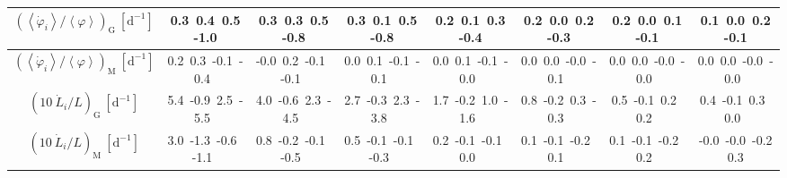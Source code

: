 \begin{table}[H]
{\begin{centering}
\begin{tabular}{|c|c|c|c|c|c|c|c|}
\hline
$\left(\left\langle \dot{\varphi}_{i}\right\rangle /\left\langle \varphi\right\rangle\right) _{\mathrm{G}}\ \left[\mathrm{d^{-1}}\right]$ & \textcolor{C1}{0.3}\ \textcolor{C2}{0.4}\ \textcolor{C3}{0.5}\ \textcolor{C4}{-1.0}\  & \textcolor{C1}{0.3}\ \textcolor{C2}{0.3}\ \textcolor{C3}{0.5}\ \textcolor{C4}{-0.8}\  & \textcolor{C1}{0.3}\ \textcolor{C2}{0.1}\ \textcolor{C3}{0.5}\ \textcolor{C4}{-0.8}\  & \textcolor{C1}{0.2}\ \textcolor{C2}{0.1}\ \textcolor{C3}{0.3}\ \textcolor{C4}{-0.4}\  & \textcolor{C1}{0.2}\ \textcolor{C2}{0.0}\ \textcolor{C3}{0.2}\ \textcolor{C4}{-0.3}\  & \textcolor{C1}{0.2}\ \textcolor{C2}{0.0}\ \textcolor{C3}{0.1}\ \textcolor{C4}{-0.1}\  & \textcolor{C1}{0.1}\ \textcolor{C2}{0.0}\ \textcolor{C3}{0.2}\ \textcolor{C4}{-0.1}\  \tabularnewline
\hline
$\left(\left\langle \dot{\varphi}_{i}\right\rangle /\left\langle \varphi\right\rangle\right) _{\mathrm{M}}\ \left[\mathrm{d^{-1}}\right]$ & \textcolor{C1}{0.2}\ \textcolor{C2}{0.3}\ \textcolor{C3}{-0.1}\ \textcolor{C4}{-0.4}\  & \textcolor{C1}{-0.0}\ \textcolor{C2}{0.2}\ \textcolor{C3}{-0.1}\ \textcolor{C4}{-0.1}\  & \textcolor{C1}{0.0}\ \textcolor{C2}{0.1}\ \textcolor{C3}{-0.1}\ \textcolor{C4}{-0.1}\  & \textcolor{C1}{0.0}\ \textcolor{C2}{0.1}\ \textcolor{C3}{-0.1}\ \textcolor{C4}{-0.0}\  & \textcolor{C1}{0.0}\ \textcolor{C2}{0.0}\ \textcolor{C3}{-0.0}\ \textcolor{C4}{-0.1}\  & \textcolor{C1}{0.0}\ \textcolor{C2}{0.0}\ \textcolor{C3}{-0.0}\ \textcolor{C4}{-0.0}\  & \textcolor{C1}{0.0}\ \textcolor{C2}{0.0}\ \textcolor{C3}{-0.0}\ \textcolor{C4}{-0.0}\  \tabularnewline
\hline
$\left(10\ \dot{L}_{i}/L\right)_{\mathrm{G}}\ \left[\mathrm{d^{-1}}\right]$ & \textcolor{C1}{5.4}\ \textcolor{C2}{-0.9}\ \textcolor{C3}{2.5}\ \textcolor{C4}{-5.5}\  & \textcolor{C1}{4.0}\ \textcolor{C2}{-0.6}\ \textcolor{C3}{2.3}\ \textcolor{C4}{-4.5}\  & \textcolor{C1}{2.7}\ \textcolor{C2}{-0.3}\ \textcolor{C3}{2.3}\ \textcolor{C4}{-3.8}\  & \textcolor{C1}{1.7}\ \textcolor{C2}{-0.2}\ \textcolor{C3}{1.0}\ \textcolor{C4}{-1.6}\  & \textcolor{C1}{0.8}\ \textcolor{C2}{-0.2}\ \textcolor{C3}{0.3}\ \textcolor{C4}{-0.3}\  & \textcolor{C1}{0.5}\ \textcolor{C2}{-0.1}\ \textcolor{C3}{0.2}\ \textcolor{C4}{0.2}\  & \textcolor{C1}{0.4}\ \textcolor{C2}{-0.1}\ \textcolor{C3}{0.3}\ \textcolor{C4}{0.0}\  \tabularnewline
\hline
$\left(10\ \dot{L}_{i}/L\right)_{\mathrm{M}}\ \left[\mathrm{d^{-1}}\right]$ & \textcolor{C1}{3.0}\ \textcolor{C2}{-1.3}\ \textcolor{C3}{-0.6}\ \textcolor{C4}{-1.1}\  & \textcolor{C1}{0.8}\ \textcolor{C2}{-0.2}\ \textcolor{C3}{-0.1}\ \textcolor{C4}{-0.5}\  & \textcolor{C1}{0.5}\ \textcolor{C2}{-0.1}\ \textcolor{C3}{-0.1}\ \textcolor{C4}{-0.3}\  & \textcolor{C1}{0.2}\ \textcolor{C2}{-0.1}\ \textcolor{C3}{-0.1}\ \textcolor{C4}{0.0}\  & \textcolor{C1}{0.1}\ \textcolor{C2}{-0.1}\ \textcolor{C3}{-0.2}\ \textcolor{C4}{0.1}\  & \textcolor{C1}{0.1}\ \textcolor{C2}{-0.1}\ \textcolor{C3}{-0.2}\ \textcolor{C4}{0.2}\  & \textcolor{C1}{-0.0}\ \textcolor{C2}{-0.0}\ \textcolor{C3}{-0.2}\ \textcolor{C4}{0.3}\  \tabularnewline

\end{tabular}
\end{centering}}
\end{table}
